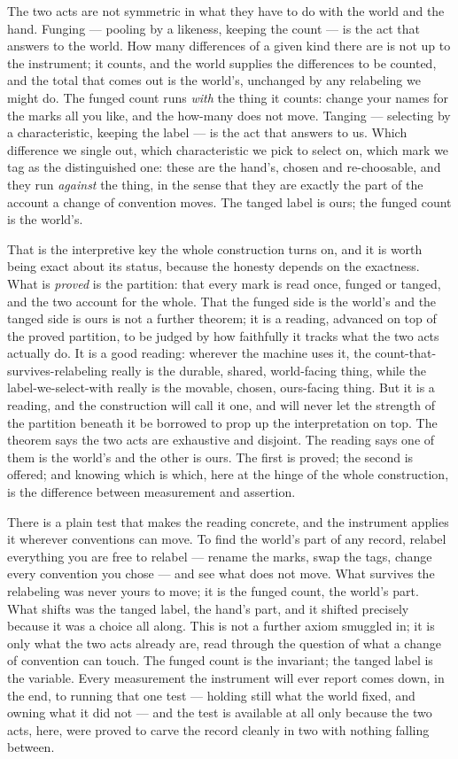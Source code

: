 The two acts are not symmetric in what they have to do with the world and the hand. Funging --- pooling by a
likeness, keeping the count --- is the act that answers to the world. How many differences of a given kind there
are is not up to the instrument; it counts, and the world supplies the differences to be counted, and the total
that comes out is the world's, unchanged by any relabeling we might do. The funged count runs \emph{with} the
thing it counts: change your names for the marks all you like, and the how-many does not move. Tanging ---
selecting by a characteristic, keeping the label --- is the act that answers to us. Which difference we single
out, which characteristic we pick to select on, which mark we tag as the distinguished one: these are the hand's,
chosen and re-choosable, and they run \emph{against} the thing, in the sense that they are exactly the part of
the account a change of convention moves. The tanged label is ours; the funged count is the world's.

That is the interpretive key the whole construction turns on, and it is worth being exact about its status,
because the honesty depends on the exactness. What is \emph{proved} is the partition: that every mark is read
once, funged or tanged, and the two account for the whole. That the funged side is the world's and the tanged
side is ours is not a further theorem; it is a reading, advanced on top of the proved partition, to be judged by
how faithfully it tracks what the two acts actually do. It is a good reading: wherever the machine uses it, the
count-that-survives-relabeling really is the durable, shared, world-facing thing, while the label-we-select-with
really is the movable, chosen, ours-facing thing. But it is a reading, and the construction will call it one, and
will never let the strength of the partition beneath it be borrowed to prop up the interpretation on top. The
theorem says the two acts are exhaustive and disjoint. The reading says one of them is the world's and the other
is ours. The first is proved; the second is offered; and knowing which is which, here at the hinge of the whole
construction, is the difference between measurement and assertion.

There is a plain test that makes the reading concrete, and the instrument applies it wherever conventions can
move. To find the world's part of any record, relabel everything you are free to relabel
--- rename the marks, swap the tags, change every convention you chose --- and see what does not move. What
survives the relabeling was never yours to move; it is the funged count, the world's part. What shifts was the
tanged label, the hand's part, and it shifted precisely because it was a choice all along. This is not a further
axiom smuggled in; it is only what the two acts already are, read through the question of what a change of
convention can touch. The funged count is the invariant; the tanged label is the variable. Every measurement the
instrument will ever report comes down, in the end, to running that one test --- holding still what the world
fixed, and owning what it did not --- and the test is available at all only because the two acts, here, were
proved to carve the record cleanly in two with nothing falling between.

